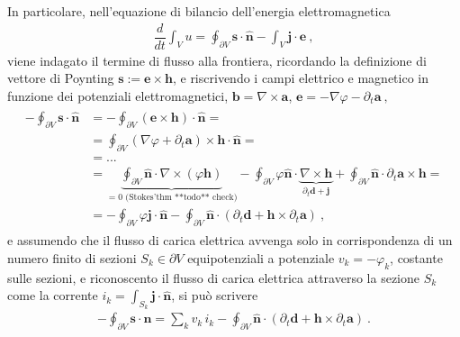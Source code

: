 \documentclass[letterpaper,10pt,italian]{jupyterBook}
\begin{document}
\sphinxAtStartPar
In particolare, nell’equazione di bilancio dell’energia elettromagnetica
\begin{equation*}
\begin{split}\dfrac{d}{dt} \int_V u = \oint_{\partial V} \mathbf{s} \cdot \hat{\mathbf{n}} - \int_V \mathbf{j} \cdot \mathbf{e} \ ,\end{split}
\end{equation*}
\sphinxAtStartPar
viene indagato il termine di flusso alla frontiera, ricordando la definizione di vettore di Poynting \(\mathbf{s} := \mathbf{e} \times \mathbf{h}\), e riscrivendo i campi elettrico e magnetico in funzione dei potenziali elettromagnetici, \(\mathbf{b} = \nabla \times \mathbf{a}\), \(\mathbf{e} = - \nabla \varphi - \partial_t \mathbf{a} \ ,\)
\begin{equation*}
\begin{split}\begin{aligned}
  - \oint_{\partial V} \mathbf{s} \cdot \mathbf{\hat{n}}
  & = - \oint_{\partial V} \left(\mathbf{e} \times \mathbf{h} \right) \cdot \mathbf{\hat{n}} = \\
  & =   \oint_{\partial V} \left(\nabla \varphi + \partial_t \mathbf{a} \right) \times \mathbf{h}  \cdot \mathbf{\hat{n}} = \\
  & = ... \\
  & = \underbrace{\oint_{\partial V} \hat{\mathbf{n}} \cdot \nabla \times ( \varphi \mathbf{h} )}_{=0 \text{ (Stokes'thm **todo** check)}} - \oint_{\partial V} \varphi \hat{\mathbf{n}} \cdot \underbrace{\nabla \times \mathbf{h}}_{\partial_t \mathbf{d} + \mathbf{j}} + \oint_{\partial V} \hat{\mathbf{n}} \cdot \partial_t \mathbf{a} \times \mathbf{h} = \\
  & = - \oint_{\partial V} \varphi \mathbf{j} \cdot \hat{\mathbf{n}} - \oint_{\partial V} \hat{\mathbf{n}} \cdot \left( \partial_t \mathbf{d} + \mathbf{h} \times \partial_t \mathbf{a} \right) \ , 
\end{aligned}\end{split}
\end{equation*}
\sphinxAtStartPar
e assumendo che il flusso di carica elettrica avvenga solo in corrispondenza di un numero finito di sezioni \(S_k \in \partial V\) equipotenziali a potenziale \(v_k = -\varphi_k\), costante sulle sezioni, e riconoscento il flusso di carica elettrica attraverso la sezione \(S_k\) come la corrente \(i_k = \int_{S_k} \mathbf{j} \cdot \hat{\mathbf{n}}\), si può scrivere
\begin{equation*}
\begin{split}- \oint_{\partial V} \mathbf{s} \cdot \hat{\mathbf{n}} = \sum_k v_k \, i_k - \oint_{\partial V} \hat{\mathbf{n}} \cdot \left( \partial_t \mathbf{d} + \mathbf{h} \times \partial_t \mathbf{a} \right) \ .\end{split}
\end{equation*}
\end{document}
